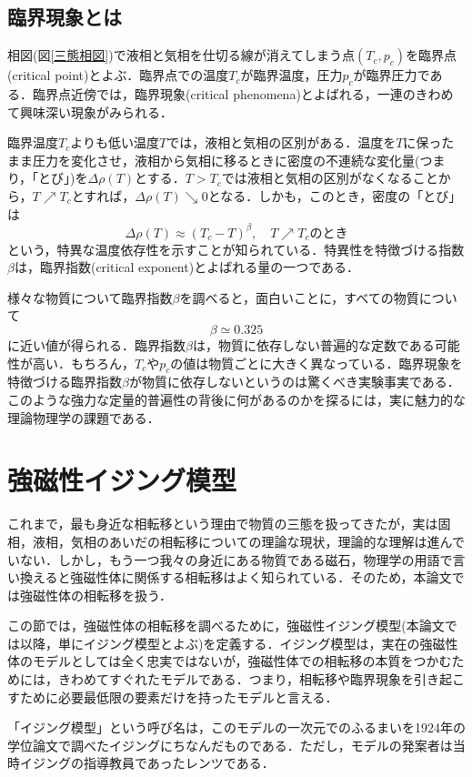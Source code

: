 \documentclass[a4paper,11pt]{jsreport}
\begin{document}
\subsection{臨界現象とは}
相図(図\ref{三態相図})で液相と気相を仕切る線が消えてしまう点$(T_c,p_c)$を臨界点(critical point)とよぶ．臨界点での温度$T_c$が臨界温度，圧力$p_c$が臨界圧力である．臨界点近傍では，臨界現象(critical phenomena)とよばれる，一連のきわめて興味深い現象がみられる．\par
臨界温度$T_c$よりも低い温度$T$では，液相と気相の区別がある．温度を$T$に保ったまま圧力を変化させ，液相から気相に移るときに密度の不連続な変化量(つまり，「とび」)を$\Delta \rho(T)$とする．$T>T_c$では液相と気相の区別がなくなることから，$T \nearrow T_c$とすれば，$\Delta \rho(T) \searrow 0$となる．しかも，このとき，密度の「とび」は
\begin{equation}
  \Delta \rho(T) \approx (T_c -T)^{\beta}, \quad T \nearrow T_c \text{のとき}
\end{equation}
という，特異な温度依存性を示すことが知られている．特異性を特徴づける指数$\beta$は，臨界指数(critical exponent)とよばれる量の一つである．\par
様々な物質について臨界指数$\beta$を調べると，面白いことに，すべての物質について
\begin{equation}
  \beta \simeq 0.325
\end{equation}
に近い値が得られる．臨界指数$\beta$は，物質に依存しない普遍的な定数である可能性が高い．もちろん，$T_c$や$p_c$の値は物質ごとに大きく異なっている．臨界現象を特徴づける臨界指数$\beta$が物質に依存しないというのは驚くべき実験事実である．このような強力な定量的普遍性の背後に何があるのかを探るには，実に魅力的な理論物理学の課題である．

\section{強磁性イジング模型}
これまで，最も身近な相転移という理由で物質の三態を扱ってきたが，実は固相，液相，気相のあいだの相転移についての理論な現状，理論的な理解は進んでいない．しかし，もう一つ我々の身近にある物質である磁石，物理学の用語で言い換えると強磁性体に関係する相転移はよく知られている．そのため，本論文では強磁性体の相転移を扱う．\par
この節では，強磁性体の相転移を調べるために，強磁性イジング模型(本論文では以降，単にイジング模型とよぶ)を定義する．イジング模型は，実在の強磁性体のモデルとしては全く忠実ではないが，強磁性体での相転移の本質をつかむためには，きわめてすぐれたモデルである．つまり，相転移や臨界現象を引き起こすために必要最低限の要素だけを持ったモデルと言える．\par
「イジング模型」という呼び名は，このモデルの一次元でのふるまいを1924年の学位論文で調べたイジングにちなんだものである．ただし，モデルの発案者は当時イジングの指導教員であったレンツである．\par
\end{document}
